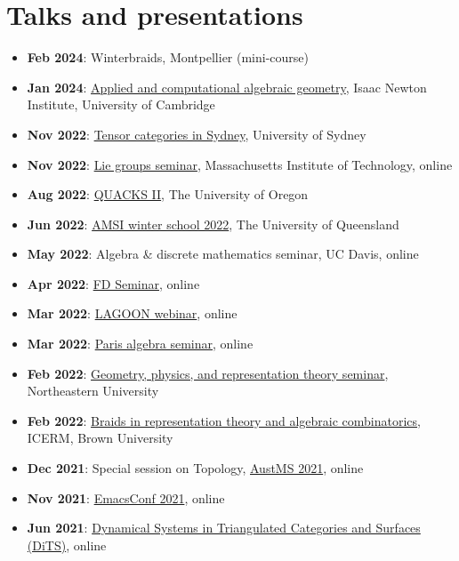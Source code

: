 \documentclass[a4paper]{moderncv}
\begin{document}
\section{Talks and presentations}
\label{sec:org08fc023}
\begin{itemize}
\item \textbf{Feb 2024}: Winterbraids, Montpellier (mini-course)
\item \textbf{Jan 2024}: \href{https://www.newton.ac.uk/event/emgw02/}{Applied and computational algebraic geometry}, Isaac Newton Institute, University of Cambridge
\item \textbf{Nov 2022}: \href{https://www.maths.usyd.edu.au/u/kevinc/TensorCat.html}{Tensor categories in Sydney}, University of Sydney
\item \textbf{Nov 2022}: \href{https://math.mit.edu/lg/}{Lie groups seminar}, Massachusetts Institute of Technology, online
\item \textbf{Aug 2022}: \href{https://pages.uoregon.edu/belias/QUACKSII/index.html}{QUACKS II}, The University of Oregon
\item \textbf{Jun 2022}: \href{https://ws.amsi.org.au/}{AMSI winter school 2022}, The University of Queensland
\item \textbf{May 2022}: Algebra \& discrete mathematics seminar, UC Davis, online
\item \textbf{Apr 2022}: \href{https://www.fd-seminar.xyz/}{FD Seminar}, online
\item \textbf{Mar 2022}: \href{https://sites.google.com/view/lagoonwebinar/home}{LAGOON webinar}, online
\item \textbf{Mar 2022}: \href{https://www.imj-prg.fr/gestion/evenement/affEvenement/1}{Paris algebra seminar}, online
\item \textbf{Feb 2022}: \href{http://mathserver.neu.edu/\~robin/Seminars/GPRT/index.html}{Geometry, physics, and representation theory seminar}, Northeastern University
\item \textbf{Feb 2022}: \href{https://icerm.brown.edu/programs/sp-s22/w1/}{Braids in representation theory and algebraic combinatorics}, ICERM, Brown University
\item \textbf{Dec 2021}: Special session on Topology, \href{https://austms.org.au/event/austms-2021/}{AustMS 2021}, online
\item \textbf{Nov 2021}: \href{https://emacsconf.org/2021/}{EmacsConf 2021}, online
\item \textbf{Jun 2021}: \href{https://sites.google.com/view/symposium-dits/}{Dynamical Systems in Triangulated Categories and Surfaces (DiTS)}, online

\end{itemize}
\end{document}
